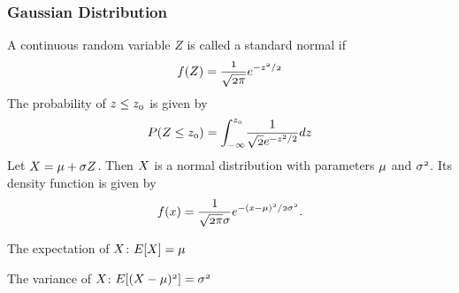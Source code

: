 \documentclass[notheorems, aspectratio=54]{beamer}
\begin{document}
\begin{frame}
\frametitle{Gaussian Distribution}
A continuous random variable $Z$ is called a standard normal if
$$\mathnormal{f(Z) = \frac{1}{\sqrt{2\pi}}e^{-z^2/2}}$$
The probability of $\mathnormal{z\leq z_0}$ is given by
$$\mathnormal{P(Z\leq z_0)} = \mathnormal{\int_{-\infty}^{z_{0}}}
\frac{1}{\mathnormal{\sqrt{2}}e^{-\mathnormal{z}^2/2}}\mathnormal{dz}$$ Let $\mathnormal{X=\mu+\sigma Z}$. Then $\mathnormal{X}$
is a normal distribution with parameters $\mathnormal{\mu}$ and $\mathnormal{\sigma^2}$. Its
density function is given by
$$\mathnormal{f(x)} = \frac{1}{\mathnormal{\sqrt{2\pi}\sigma}}\mathnormal{e^{-(x-\mu)^2/2\sigma^2}}.$$ 

The expectation of $\mathnormal{X}$: $\mathnormal{E[X]=\mu}$

The variance of $\mathnormal{X}$: $\mathnormal{E[(X-\mu)^2]=\sigma^2}$
\end{frame}
\end{document}
